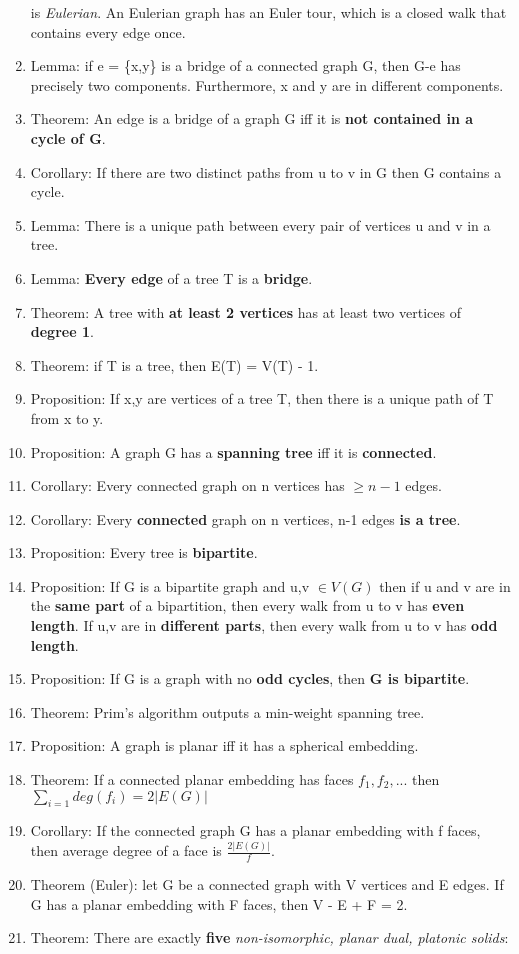 \documentclass[]{article}
\begin{document}
\begin{enumerate}
  is \emph{Eulerian}. An Eulerian graph has an Euler tour, which is a
  closed walk that contains every edge once.
\item
  Lemma: if e = \{x,y\} is a bridge of a connected graph G, then G-e has
  precisely two components. Furthermore, x and y are in different
  components.
\item
  Theorem: An edge is a bridge of a graph G iff it is \textbf{not
  contained in a cycle of G}.
\item
  Corollary: If there are two distinct paths from u to v in G then G
  contains a cycle.
\item
  Lemma: There is a unique path between every pair of vertices u and v
  in a tree.
\item
  Lemma: \textbf{Every edge} of a tree T is a \textbf{bridge}.
\item
  Theorem: A tree with \textbf{at least 2 vertices} has at least two
  vertices of \textbf{degree 1}.
\item
  Theorem: if T is a tree, then \textbar{}E(T)\textbar{} =
  \textbar{}V(T) - 1\textbar{}.
\item
  Proposition: If x,y are vertices of a tree T, then there is a unique
  path of T from x to y.
\item
  Proposition: A graph G has a \textbf{spanning tree} iff it is
  \textbf{connected}.
\item
  Corollary: Every connected graph on n vertices has $\geq n-1$ edges.
\item
  Corollary: Every \textbf{connected} graph on n vertices, n-1 edges
  \textbf{is a tree}.
\item
  Proposition: Every tree is \textbf{bipartite}.
\item
  Proposition: If G is a bipartite graph and u,v $\in V(G)$ then if u
  and v are in the \textbf{same part} of a bipartition, then every walk
  from u to v has \textbf{even length}. If u,v are in \textbf{different
  parts}, then every walk from u to v has \textbf{odd length}.
\item
  Proposition: If G is a graph with no \textbf{odd cycles}, then
  \textbf{G is bipartite}.
\item
  Theorem: Prim's algorithm outputs a min-weight spanning tree.
\item
  Proposition: A graph is planar iff it has a spherical embedding.
\item
  Theorem: If a connected planar embedding has faces $f_1, f_2, ...$
  then $\sum_{i=1} deg(f_i) = 2|E(G)|$
\item
  Corollary: If the connected graph G has a planar embedding with f
  faces, then average degree of a face is $\frac{2|E(G)|}{f}$.
\item
  Theorem (Euler): let G be a connected graph with \textbar{}V\textbar{}
  vertices and \textbar{}E\textbar{} edges. If G has a planar embedding
  with \textbar{}F\textbar{} faces, then \textbar{}V\textbar{} -
  \textbar{}E\textbar{} + \textbar{}F\textbar{} = 2.
\item
  Theorem: There are exactly \textbf{five} \emph{non-isomorphic, planar
  dual, platonic solids}:


\end{enumerate}
\end{document}

